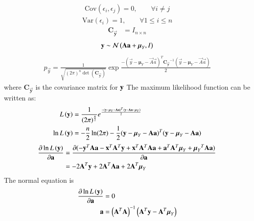 \documentclass[journal,12pt,onecolumn]{IEEEtran}
\theoremstyle{remark}
\begin{document}
\begin{align}
\textrm{Cov}({\epsilon}_i,{\epsilon}_j)=0 , \qquad \forall i\neq j
\end{align}
\begin{align}
\textrm{Var}({\epsilon}_i)=1 , \qquad \forall 1\leq i\leq n
\end{align}
\begin{align}
 \mathbf{C_{\vec{y}}}&=I_{n\times n}
 \end{align}
\begin{align}
\vec{y} \sim \gauss{\vec{A}\vec{a}+{\boldsymbol{\mu}}_{Y}}{I}
\end{align}
\begin{align}
p_{\vec{y}}= \frac{1}{\sqrt{ (2\pi)^n \det( \mathbf{C_{\vec{y}}})}} \exp \frac{-({\vec{y}-{\boldsymbol{\mu}}}_{Y}-\vec{A}\vec{a})^T{\mathbf{C_{\vec{y}}}^{-1}}{({\vec{y}-{\boldsymbol{\mu}}_{Y}}-\vec{A}\vec{a})}}{2}
\end{align}
where $ \mathbf{C_{\vec{y}}} $ is the covariance matrix for $\vec{y}\\$
The maximum likelihood function can be written as:
\begin{align}
L\brak{\vec{y}}&=\frac{1}{{(2\pi)}^{\frac{n}{2}}}e^\frac{-({\vec{y}-{\boldsymbol{\mu}}}_{Y}-\vec{A}\vec{a})^T{({\vec{y}-\vec{A}\vec{a}-{\boldsymbol{\mu}}_{Y}})}}{2}\\
\ln L\brak{\vec{y}}&=-\frac{n}{2}\ln(2\pi)-\dfrac12 ({\vec{y}-{\boldsymbol{\mu}}}_{Y}-\vec{A}\vec{a})^T{({\vec{y}-{\boldsymbol{\mu}}_{Y}}-\vec{A}\vec{a})}
\end{align}
\begin{align}
\frac{\partial \ln L\brak{\vec{y}}}{\partial \vec{a}}&=\frac{\partial (-\vec{y}^T\vec{A}\vec{a}-\vec{x}^T\vec{A}^T\vec{y}+\vec{x}^T\vec{A}^T\vec{A}\vec{a}+\vec{a}^T\vec{A}^T\vec{\boldsymbol{\mu}}_{Y}+{\vec{\boldsymbol{\mu}}_{Y}}^T\vec{A}\vec{a})}{\partial \vec{a}}\\
&=-2\vec{A}^T\vec{y}+2\vec{A}^T\vec{A}\vec{a}+2\vec{A}^T\vec{\boldsymbol{\mu}}_{Y}
\end{align}
The normal equation is
\begin{align}
\frac{\partial \ln L\brak{\vec{y}}}{\partial \vec{a}}&=0\\
\vec{a}&=\brak{{\vec{A}}^T\vec{A}}^{-1}\brak{{\vec{A}}^T\vec{y}-\vec{A}^T\vec{\boldsymbol{\mu}}_{Y}}
\end{align}
\end{document}
